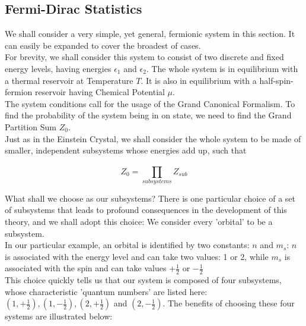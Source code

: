 \documentclass[oneside]{book}
\begin{document}
\subsection{Fermi-Dirac Statistics}
We shall consider a very simple, yet general, fermionic system in this section. It can easily be expanded to cover the broadest of cases.\\

For brevity, we shall consider this system to consist of two discrete and fixed energy levels, having energies $\epsilon_1$ and 
$\epsilon_2$. The whole system is in equilibrium with a thermal reservoir at Temperature $T$. It is also in equilibrium with a half-spin-fermion reservoir having Chemical Potential $\mu$.\\

The system conditions call for the usage of the Grand Canonical Formalism. To find the probability of the system being in on state, we need to find the Grand Partition Sum $Z_0$.\\

Just as in the Einstein Crystal, we shall consider the whole system to be made of smaller, independent subsystems whose energies add up, such that 

\[Z_{0} = \prod_{subsystems}^{}Z_{sub}\]

What shall we choose as our subsystems? There is one particular choice of a set of subsystems that leads to profound consequences in the development of this theory, and we shall adopt this choice: We consider every 'orbital' to be a subsystem.\\

In our particular example, an orbital is identified by two constants: $n$ and $m_s$: $n$ is associated with the energy level and can take two values: 1 or 2, while $m_s$ is associated with the spin and can take values $+\frac{1}{2}$ or $-\frac{1}{2}$\\

This choice quickly tells us that our system is composed of four subsystems, whose characteristic 'quantum numbers' are listed here: $(1,+\frac{1}{2}), (1,-\frac{1}{2}), (2,+\frac{1}{2})$ and $(2,-\frac{1}{2})$. The benefits of choosing these four systems are illustrated below:
\end{document}
